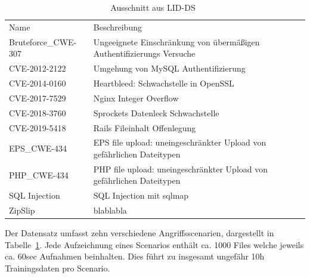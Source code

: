             \begin{table}[h]
                \small
                \centering
                \begin{tabular}{p{3cm}|p{6.5cm}}
                    \rowcolor{Gray!36}
                    \hline
                    \multicolumn{2}{c}{Scenarien}\\
                    \hline
                    Name & Beschreibung \\
                    \rowcolor{Gray!16}
                    \hline
                    \hline
                    Bruteforce\_CWE-307 & Ungeeignete Einschränkung von übermäßigen Authentifizierungs Versuche \\
                    \hline
                    CVE-2012-2122 & Umgehung von MySQL Authentifizierung\\
                    \rowcolor{Gray!16}
                    \hline
                    CVE-2014-0160 & Heartbleed: Schwachstelle in OpenSSL\\
                    \hline
                    CVE-2017-7529 & Nginx Integer Overflow \\
                    \rowcolor{Gray!16}
                    \hline
                    CVE-2018-3760 & Sprockets Datenleck Schwachstelle \\
                    \hline
                    CVE-2019-5418 & Rails Fileinhalt Offenlegung \\
                    \rowcolor{Gray!16}
                    \hline
                    EPS\_CWE-434 & EPS file upload: uneingeschränkter Upload von gefährlichen Dateitypen  \\
                    \hline
                    PHP\_CWE-434 & PHP file upload: uneingeschränkter Upload von gefährlichen Dateitypen  \\
                    \rowcolor{Gray!16}
                    \hline
                    SQL Injection & SQL Injection mit sqlmap\\
                    \hline
                    ZipSlip & blablabla \\
                \end{tabular}
                \caption{Ausschnitt aus LID-DS~\cite{LIDDS}}
                \label{tab:scenarien}
            \end{table}
            Der Datensatz umfasst zehn verschiedene Angriffsscenarien, dargestellt in Tabelle~\ref{tab:scenarien}.
            Jede Aufzeichnung eines Scenarios enthält ca. 1000 Files welche jeweils ca. 60sec Aufnahmen beinhalten.
            Dies führt zu insgesamt ungefähr 10h Trainingsdaten pro Scenario.

